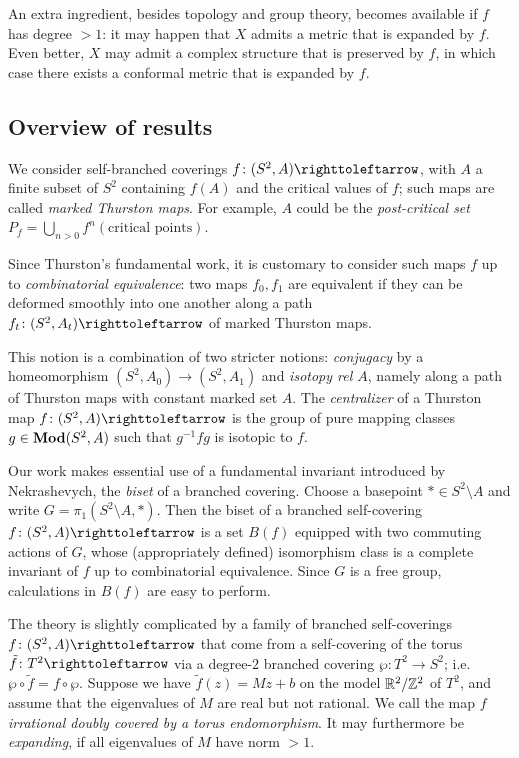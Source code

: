 \documentclass{amsart}
\begin{document}
An extra ingredient, besides topology and group theory, becomes
available if $f$ has degree $>1$: it may happen that $X$ admits a
metric that is expanded by $f$. Even better, $X$ may admit a complex
structure that is preserved by $f$, in which case there exists a
conformal metric that is expanded by $f$.

\subsection{Overview of results}\label{ss:overview}
We consider self-branched coverings $f\colon(S^2,A)\selfmap$, with $A$ a
finite subset of $S^2$ containing $f(A)$ and the critical values of $f$;
such maps are called \emph{marked Thurston maps}. For example, $A$ could be
the \emph{post-critical set} $P_f=\bigcup_{n>0}f^n(\text{critical
  points})$.

Since Thurston's fundamental work, it is customary to consider such
maps $f$ up to \emph{combinatorial equivalence}: two maps $f_0,f_1$
are equivalent if they can be deformed smoothly into one another along
a path $f_t\colon(S^2,A_t)\selfmap$ of marked Thurston maps.

This notion is a combination of two stricter notions: \emph{conjugacy}
by a homeomorphism $(S^2,A_0)\to(S^2,A_1)$ and \emph{isotopy rel $A$},
namely along a path of Thurston maps with constant marked set $A$. The
\emph{centralizer} of a Thurston map $f\colon(S^2,A)\selfmap$ is the
group of pure mapping classes $g\in\mathbf{\relax Mod}(S^2,A)$ such that $g^{-1}f g$
is isotopic to $f$.

Our work makes essential use of a fundamental invariant introduced by
Nekrashevych, the \emph{biset} of a branched covering. Choose a
basepoint $*\in S^2\setminus A$ and write $G=\pi_1(S^2\setminus A,*)$.
Then the biset of a branched self-covering $f\colon(S^2,A)\selfmap$ is
a set $B(f)$ equipped with two commuting actions of $G$, whose
(appropriately defined) isomorphism class is a complete invariant of
$f$ up to combinatorial equivalence.  Since $G$ is a free group,
calculations in $B(f)$ are easy to perform.

The theory is slightly complicated by a family of branched
self-coverings $f\colon(S^2,A)\selfmap$ that come from a self-covering
of the torus $\tilde f\colon T^2\selfmap$ via a degree-$2$ branched
covering $\wp\colon T^2\to S^2$; i.e.\ $\wp\circ\tilde f=f\circ\wp$.
Suppose we have $\tilde f(z)=M z+b$ on the model ${\mathbb R}^2/{\mathbb Z}^2$ of $T^2$,
and assume that the eigenvalues of $M$ are real but not rational. We
call the map $f$ \emph{irrational doubly covered by a torus
  endomorphism}. It may furthermore be \emph{expanding}, if all
eigenvalues of $M$ have norm $>1$.
\end{document}
